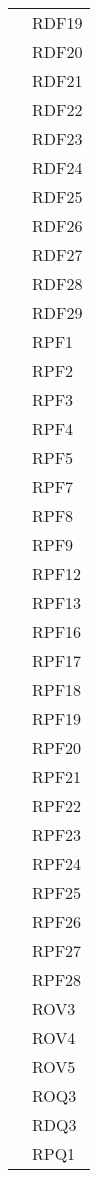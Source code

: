 \begin{longtable}{| p{5cm} | p{5cm} |}
				&	RDF19 \\
				&	RDF20 \\
				&	RDF21 \\
				&	RDF22 \\
				&	RDF23 \\
				&	RDF24 \\
				&	RDF25 \\
				&	RDF26 \\
				&	RDF27 \\
				&	RDF28 \\
				&	RDF29 \\
				&	RPF1 \\
				&	RPF2 \\
				&	RPF3 \\
				&	RPF4 \\
				&	RPF5 \\
				&	RPF7 \\
				&	RPF8 \\
				&	RPF9 \\
				&	RPF12 \\
				&	RPF13 \\
				&	RPF16 \\
				&	RPF17 \\
				&	RPF18 \\
				&	RPF19 \\
				&	RPF20 \\
				&	RPF21 \\
				&	RPF22 \\
				&	RPF23 \\
				&	RPF24 \\
				&	RPF25\\
				&	RPF26 \\
				&	RPF27 \\
				& 	RPF28 \\
				&	ROV3 \\
				&	ROV4 \\
				&	ROV5 \\
				&	ROQ3 \\
				&	RDQ3 \\
				&	RPQ1 \\
				 \hline
					

\end{longtable}
